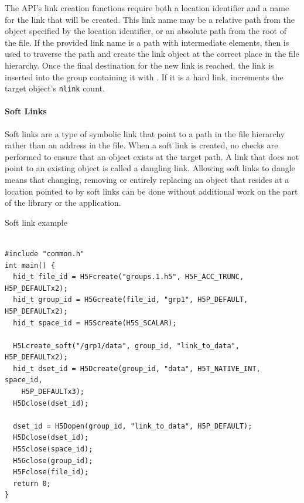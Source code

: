 The API's link creation functions require both a location identifier and a name for the link that will be created. This link name may be a relative path from the object specified by the location identifier, or an absolute path from the root of the file. If the provided link name is a path with intermediate elements, then  is used to traverse the path and create the link object at the correct place in the file hierarchy. Once the final destination for the new link is reached, the link is inserted into the group containing it with . If it is a hard link,  increments the target object's \texttt{nlink} count.

\paragraph{Soft Links} Soft links are a type of symbolic link that point to a path in the file hierarchy rather than an address in the file. When a soft link is created, no checks are performed to ensure that an object exists at the target path. A link that does not point to an existing object is called a dangling link. Allowing soft links to dangle means that changing, removing or entirely replacing an object that resides at a location pointed to by soft links can be done without additional work on the part of the library or the application.

\begin{listing}
\centering
\caption{Soft link example}
\label{lst:soft-link-example}
\begin{verbatim}

#include "common.h"
int main() {
  hid_t file_id = H5Fcreate("groups.1.h5", H5F_ACC_TRUNC, H5P_DEFAULTx2);
  hid_t group_id = H5Gcreate(file_id, "grp1", H5P_DEFAULT, H5P_DEFAULTx2);
  hid_t space_id = H5Screate(H5S_SCALAR);

  H5Lcreate_soft("/grp1/data", group_id, "link_to_data", H5P_DEFAULTx2);
  hid_t dset_id = H5Dcreate(group_id, "data", H5T_NATIVE_INT, space_id,
    H5P_DEFAULTx3);
  H5Dclose(dset_id);

  dset_id = H5Dopen(group_id, "link_to_data", H5P_DEFAULT);
  H5Dclose(dset_id);
  H5Sclose(space_id);
  H5Gclose(group_id);
  H5Fclose(file_id);
  return 0;
}

\end{verbatim}
\end{listing}

